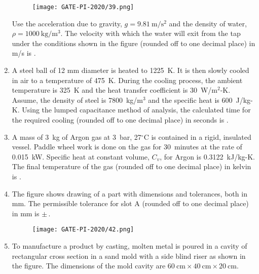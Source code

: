 \documentclass[journal,12pt,onecolumn]{IEEEtran}
\theoremstyle{remark}
\begin{document}
\begin{enumerate}
\begin{figure}[H]
    \centering
    \texttt{[image: GATE-PI-2020/39.png]} 
    \caption{}
    \label{39}
\end{figure}

Use the acceleration due to gravity, $g = 9.81~\text{m}/\text{s}^2$ and the density of water, $\rho = 1000~\text{kg}/\text{m}^3$. The velocity with which the water will exit from the tap under the conditions shown in the figure (rounded off to one decimal place) in m/s is \underline{\hspace{2cm}}.
\vspace{1cm}

\item A steel ball of 12 mm diameter is heated to 1225~K. It is then slowly cooled in air to a temperature of 475~K. During the cooling process, the ambient temperature is 325~K and the heat transfer coefficient is 30~W/m$^2$-K. Assume, the density of steel is 7800~kg/m$^3$ and the specific heat is 600~J/kg-K. Using the lumped capacitance method of analysis, the calculated time for the required cooling (rounded off to one decimal place) in seconds is \underline{\hspace{2cm}}.
\vspace{1cm}

\item A mass of 3~kg of Argon gas at 3~bar, 27$^\circ$C is contained in a rigid, insulated vessel. Paddle wheel work is done on the gas for 30~minutes at the rate of 0.015~kW. Specific heat at constant volume, $C_v$, for Argon is 0.3122~kJ/kg-K. The final temperature of the gas (rounded off to one decimal place) in kelvin is \underline{\hspace{2cm}}.
\vspace{1cm}
\newpage
\item The figure shows drawing of a part with dimensions and tolerances, both in mm. The permissible tolerance for slot A (rounded off to one decimal place) in mm is $\pm$\,\underline{\hspace{2cm}}.

\begin{figure}[H]
    \centering
    \texttt{[image: GATE-PI-2020/42.png]} 
    \caption{}
    \label{42}
\end{figure}
\vspace{1cm}

\item To manufacture a product by casting, molten metal is poured in a cavity of rectangular cross section in a sand mold with a side blind riser as shown in the figure. The dimensions of the mold cavity are $60~\text{cm} \times 40~\text{cm} \times 20~\text{cm}$.


\end{enumerate}
\end{document}
